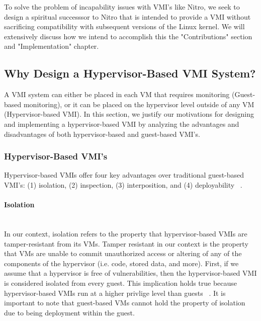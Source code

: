 \documentclass{report}
\begin{document}
\begin{spacing}{1.5}
{\large
To solve the problem of incapability issues with VMI's like Nitro, we seek to design a spiritual successsor to Nitro that is intended to provide a VMI without sacrificing compatibility with subsequent versions of the Linux kernel. We will extensively discuss how we intend to accomplish this the "Contributions" section and "Implementation" chapter.
\newline
}










\subsection{Why Design a Hypervisor-Based VMI System?}

{\large
A VMI system can either be placed in each VM that requires monitoring (Guest-based monitoring), or it can be placed on the hypervisor level outside of any VM (Hypervisor-based VMI). In this section, we justify our motivations for designing and implementing a hypervisor-based VMI by analyzing the advantages and disadvantages of both hypervisor-based and guest-based VMI's. 
}

\subsubsection{Hypervisor-Based VMI's}


{\large
Hypervisor-based VMIs offer four key advantages over traditional guest-based VMI's: (1) isolation, (2) inspection, (3) interposition, and (4) deployability ~\cite{pfoh2009formal}.
\newline
}

\paragraph{Isolation}\mbox{}\\

{\large
In our context, isolation refers to the property that hypervisor-based VMIs are tamper-resistant from its VMs. Tamper resistant in our context is the property that VMs are unable to commit unauthorized access or altering of any of the components of the hypervisor (i.e. code, stored data, and more). First, if we assume that a hypervisor is free of vulnerabilities, then the hypervisor-based VMI is considered isolated from every guest. This implication holds true because hypervisor-based VMIs run at a higher privlige level than guests ~\cite{hebbal2015virtual}. It is important to note that guest-based VMs cannot hold the property of isolation due to being deployment within the guest.
\newline
}


\end{spacing}
\end{document}
